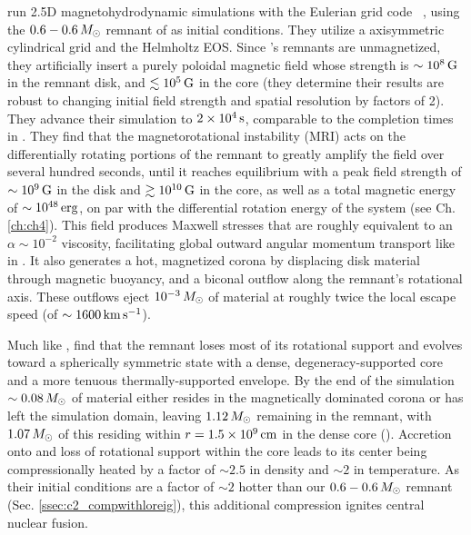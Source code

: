 \cite{ji+13} run 2.5D magnetohydrodynamic simulations with the Eulerian grid code \flash\ \citep{fryx+00}, using the $0.6 - 0.6\,\Msun$ remnant of \citeal{loreig09} as initial conditions.  They utilize a axisymmetric cylindrical grid and the Helmholtz EOS.  Since \citeal{loreig09}'s remnants are unmagnetized, they artificially insert a purely poloidal magnetic field whose strength is $\sim10^8\,\mathrm{G}$ in the remnant disk, and $\lesssim10^5\,\mathrm{G}$ in the core (they determine their results are robust to changing initial field strength and spatial resolution by factors of 2).  They advance their simulation to $2\times10^4\,\mathrm{s}$, comparable to the completion times in \cite{schw+12}.  They find that the magnetorotational instability (MRI) acts on the differentially rotating portions of the remnant to greatly amplify the field over several hundred seconds, until it reaches equilibrium with a peak field strength of $\sim10^9\,\mathrm{G}$ in the disk and $\gtrsim10^{10}\,\mathrm{G}$ in the core, as well as a total magnetic energy of $\sim10^{48}\,\mathrm{erg}$, on par with the differential rotation energy of the system (see Ch. \ref{ch:ch4}).  This field produces Maxwell stresses that are roughly equivalent to an $\alpha \sim 10^{-2}$ viscosity, facilitating global outward angular momentum transport like in \cite{schw+12}.  It also generates a hot, magnetized corona by displacing disk material through magnetic buoyancy, and a biconal outflow along the remnant's rotational axis.  These outflows eject $10^{-3}\,\Msun$ of material at roughly twice the local escape speed (of $\sim1600\,\mrm{km}\,\psec$).  

Much like \cite{schw+12}, \cite{ji+13} find that the remnant loses most of its rotational support and evolves toward a spherically symmetric state with a dense, degeneracy-supported core and a more tenuous thermally-supported envelope.  By the end of the simulation $\sim0.08\,\Msun$ of material either resides in the magnetically dominated corona or has left the simulation domain, leaving $1.12\,\Msun$ remaining in the remnant, with $1.07\,\Msun$ of this residing within $r = 1.5\times10^9\,\mathrm{cm}$ in the dense core (\bobjiprivcomm).  Accretion onto and loss of rotational support within the core leads to its center being compressionally heated by a factor of $\sim2.5$ in density and $\sim2$ in temperature.  As their initial conditions are a factor of $\sim2$ hotter than our $0.6 - 0.6\,\Msun$ remnant (Sec. \ref{ssec:c2_compwithloreig}), this additional compression ignites central nuclear fusion.

